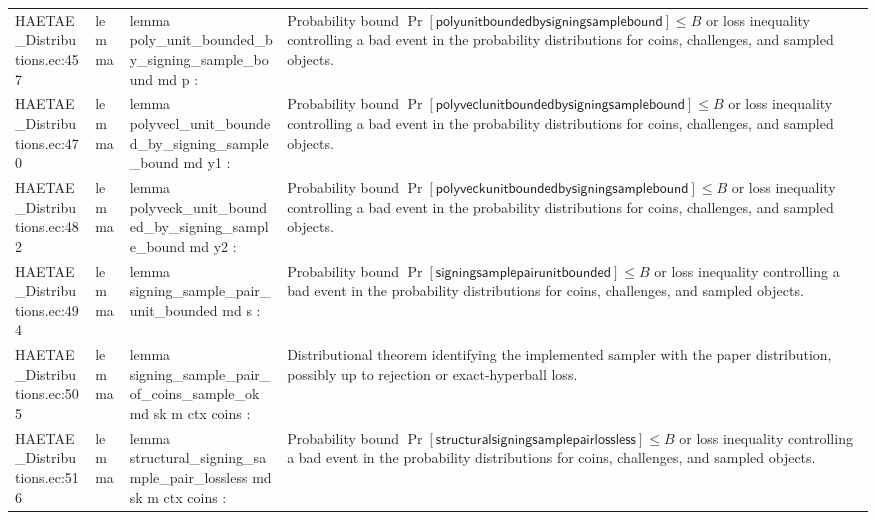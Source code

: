 \documentclass[10pt]{article}
\begin{document}
\begin{longtable}{L{0.11\textwidth}L{0.055\textwidth}L{0.385\textwidth}L{0.41\textwidth}}
HAETAE\_\allowbreak{}Distributions.\allowbreak{}ec:\allowbreak{}457 & lemma & {\ttfamily\scriptsize lemma poly\_\allowbreak{}unit\_\allowbreak{}bounded\_\allowbreak{}by\_\allowbreak{}signing\_\allowbreak{}sample\_\allowbreak{}bound md p :} & Probability bound $\Pr[\mathsf{polyunitboundedbysigningsamplebound}]\le B$ or loss inequality controlling a bad event in the probability distributions for coins, challenges, and sampled objects. \\
HAETAE\_\allowbreak{}Distributions.\allowbreak{}ec:\allowbreak{}470 & lemma & {\ttfamily\scriptsize lemma polyvecl\_\allowbreak{}unit\_\allowbreak{}bounded\_\allowbreak{}by\_\allowbreak{}signing\_\allowbreak{}sample\_\allowbreak{}bound md y1 :} & Probability bound $\Pr[\mathsf{polyveclunitboundedbysigningsamplebound}]\le B$ or loss inequality controlling a bad event in the probability distributions for coins, challenges, and sampled objects. \\
HAETAE\_\allowbreak{}Distributions.\allowbreak{}ec:\allowbreak{}482 & lemma & {\ttfamily\scriptsize lemma polyveck\_\allowbreak{}unit\_\allowbreak{}bounded\_\allowbreak{}by\_\allowbreak{}signing\_\allowbreak{}sample\_\allowbreak{}bound md y2 :} & Probability bound $\Pr[\mathsf{polyveckunitboundedbysigningsamplebound}]\le B$ or loss inequality controlling a bad event in the probability distributions for coins, challenges, and sampled objects. \\
HAETAE\_\allowbreak{}Distributions.\allowbreak{}ec:\allowbreak{}494 & lemma & {\ttfamily\scriptsize lemma signing\_\allowbreak{}sample\_\allowbreak{}pair\_\allowbreak{}unit\_\allowbreak{}bounded md s :} & Probability bound $\Pr[\mathsf{signingsamplepairunitbounded}]\le B$ or loss inequality controlling a bad event in the probability distributions for coins, challenges, and sampled objects. \\
HAETAE\_\allowbreak{}Distributions.\allowbreak{}ec:\allowbreak{}505 & lemma & {\ttfamily\scriptsize lemma signing\_\allowbreak{}sample\_\allowbreak{}pair\_\allowbreak{}of\_\allowbreak{}coins\_\allowbreak{}sample\_\allowbreak{}ok md sk m ctx coins :} & Distributional theorem identifying the implemented sampler with the paper distribution, possibly up to rejection or exact-hyperball loss. \\
HAETAE\_\allowbreak{}Distributions.\allowbreak{}ec:\allowbreak{}516 & lemma & {\ttfamily\scriptsize lemma structural\_\allowbreak{}signing\_\allowbreak{}sample\_\allowbreak{}pair\_\allowbreak{}lossless md sk m ctx coins :} & Probability bound $\Pr[\mathsf{structuralsigningsamplepairlossless}]\le B$ or loss inequality controlling a bad event in the probability distributions for coins, challenges, and sampled objects. \\

\end{longtable}
\end{document}
